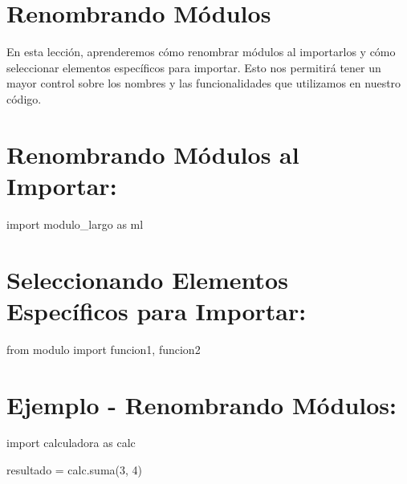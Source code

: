 \documentclass[
  a4paper,
  DIV=11,
  numbers=noendperiod,
  onepage,
  openany]{scrreprt}
\newenvironment{Shaded}{\begin{snugshade}}{\end{snugshade}}
\newcommand{\DecValTok}[1]{\textcolor[rgb]{0.68,0.00,0.00}{#1}}
\newcommand{\ImportTok}[1]{\textcolor[rgb]{0.00,0.46,0.62}{#1}}
\newcommand{\NormalTok}[1]{\textcolor[rgb]{0.00,0.23,0.31}{#1}}
\newcommand{\OperatorTok}[1]{\textcolor[rgb]{0.37,0.37,0.37}{#1}}
\begin{document}
\hypertarget{renombrando-muxf3dulos-1}{%
\section{Renombrando Módulos}\label{renombrando-muxf3dulos-1}}

En esta lección, aprenderemos cómo renombrar módulos al importarlos y
cómo seleccionar elementos específicos para importar. Esto nos permitirá
tener un mayor control sobre los nombres y las funcionalidades que
utilizamos en nuestro código.

\hypertarget{renombrando-muxf3dulos-al-importar-1}{%
\section{Renombrando Módulos al
Importar:}\label{renombrando-muxf3dulos-al-importar-1}}

\begin{Shaded}
\begin{Highlighting}[]
\ImportTok{import}\NormalTok{ modulo\_largo }\ImportTok{as}\NormalTok{ ml}
\end{Highlighting}
\end{Shaded}

\hypertarget{seleccionando-elementos-especuxedficos-para-importar-1}{%
\section{Seleccionando Elementos Específicos para
Importar:}\label{seleccionando-elementos-especuxedficos-para-importar-1}}

\begin{Shaded}
\begin{Highlighting}[]
\ImportTok{from}\NormalTok{ modulo }\ImportTok{import}\NormalTok{ funcion1, funcion2}
\end{Highlighting}
\end{Shaded}

\hypertarget{ejemplo---renombrando-muxf3dulos-1}{%
\section{Ejemplo - Renombrando
Módulos:}\label{ejemplo---renombrando-muxf3dulos-1}}

\begin{Shaded}
\begin{Highlighting}[]
\ImportTok{import}\NormalTok{ calculadora }\ImportTok{as}\NormalTok{ calc}

\NormalTok{resultado }\OperatorTok{=}\NormalTok{ calc.suma(}\DecValTok{3}\NormalTok{, }\DecValTok{4}\NormalTok{)}
\end{Highlighting}
\end{Shaded}
\end{document}
